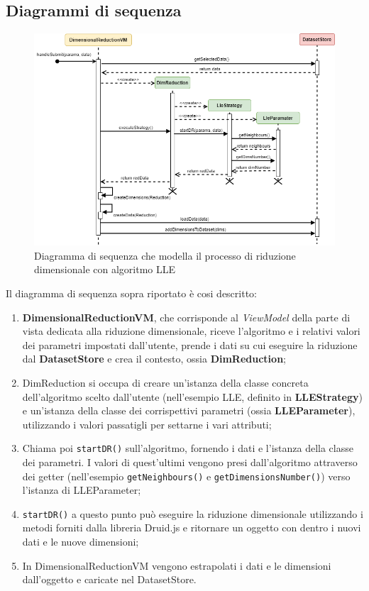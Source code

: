 \subsection{Diagrammi di sequenza}
\begin{figure}[hb]
\includegraphics[width=16cm]{Images/Allegato Tecnico-Sequenza-DR}
\centering
\caption{Diagramma di sequenza che modella il processo di riduzione dimensionale con algoritmo LLE}
\end{figure}
Il diagramma di sequenza sopra riportato è cosi descritto:
\begin{enumerate}
	\item \textbf{DimensionalReductionVM}, che corrisponde al \textit{ViewModel} della parte di vista dedicata alla riduzione dimensionale, riceve l'algoritmo e i relativi valori dei parametri impostati dall'utente, prende i dati su cui eseguire la riduzione dal \textbf{DatasetStore} e crea il contesto, ossia \textbf{DimReduction};
	\item DimReduction si occupa di creare un'istanza della classe concreta dell'algoritmo scelto dall'utente (nell'esempio LLE, definito in \textbf{LLEStrategy}) e un'istanza della classe dei corrispettivi parametri (ossia \textbf{LLEParameter}), utilizzando i valori passatigli per settarne i vari attributi;
	\item Chiama poi \texttt{startDR()} sull'algoritmo, fornendo i dati e l'istanza della classe dei parametri. I valori di quest'ultimi vengono presi dall'algoritmo attraverso dei getter (nell'esempio \texttt{getNeighbours()} e \texttt{getDimensionsNumber()}) verso l'istanza di LLEParameter;
	\item \texttt{startDR()} a questo punto può eseguire la riduzione dimensionale utilizzando i metodi forniti dalla libreria Druid.js e ritornare un oggetto con dentro i nuovi dati e le nuove dimensioni;
	\item In DimensionalReductionVM vengono estrapolati i dati e le dimensioni dall'oggetto e caricate nel DatasetStore.
\end{enumerate}

